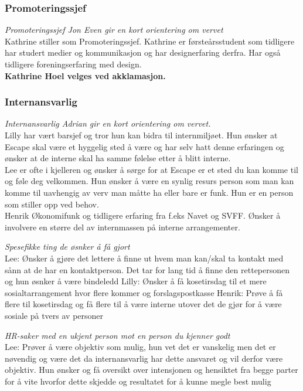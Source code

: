 \documentclass[10pt,norsk,a4paper]{article}
\begin{document}
\begin{multicols}{2}
\subsubsection{Promoteringssjef}
\textit{Promoteringssjef Jon Even gir en kort orientering om vervet}\\
Kathrine stiller som Promoteringssjef. Kathrine er førsteårsstudent
som tidligere har studert medier og kommunikasjon og har designerfaring derfra.
Har også tidligere foreningserfaring med design. \\
\textbf{Kathrine Hoel velges ved akklamasjon.}
\newpage

\subsubsection{Internansvarlig}
\textit{Internansvarlig Adrian gir en kort orientering om vervet.}\\
Lilly har vært barsjef og tror hun kan bidra til internmiljøet. Hun
ønsker at Escape skal være et hyggelig sted å være og har selv hatt denne
erfaringen og ønsker at de interne skal ha samme følelse etter å blitt
interne.\\
Lee er ofte i kjelleren og ønsker å sørge for at Escape er et sted
du kan komme til og føle deg velkommen. Hun ønsker å være en synlig resurs
person som man kan komme til uavhengig av verv man måtte ha eller bare er
funk. Hun er en person som stiller opp ved behov.\\
Henrik Økonomifunk og tidligere erfaring fra f.eks Navet og SVFF. Ønsker å
involvere en større del av internmassen på interne arrangementer.

\textit{Spesefikke ting de øsnker å få gjort}\\
Lee: Ønsker å gjøre det lettere å finne ut hvem man kan/skal ta kontakt med
sånn at de har en kontaktperson. Det tar for lang tid å finne den
rettepersonen og hun øsnker å være bindeledd
Lilly: Ønsker å få kosetirsdag til et mere sosialtarrangement hvor flere kommer
og forslagspostkasse
Henrik: Prøve å få flere til kosetirsdag og få flere til å være interne utover
det de gjør for å være sosiale på tvers av personer

\textit{HR-saker med en ukjent person mot en person du kjenner godt}\\
Lee: Prøver å være objektiv som mulig, hun vet det er vanskelig men det er
nøvendig og være det da internansvarlig har dette ansvaret og vil derfor være
objektiv. Hun ønsker og få oversikt over intensjonen og hensiktet fra begge
parter for å vite hvorfor dette skjedde og resultatet for å kunne megle best
mulig


\end{multicols}
\end{document}
